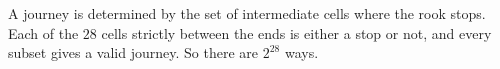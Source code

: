 A journey is determined by the set of intermediate cells where the rook stops. Each of the $28$ cells strictly between the ends is either a stop or not, and every subset gives a valid journey. So there are $\boxed{2^{28}}$ ways.
